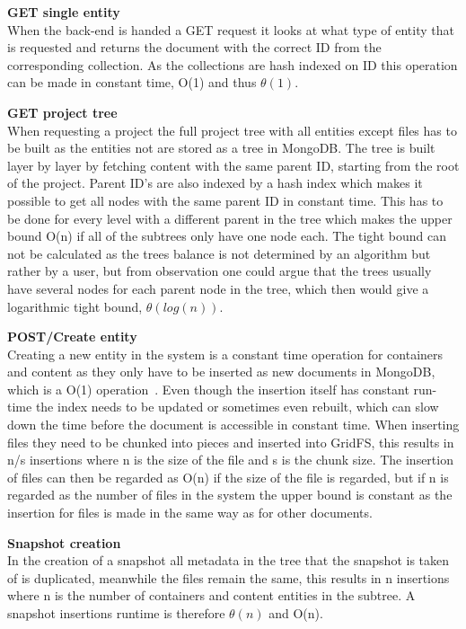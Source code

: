 \documentclass[a4paper,12pt]{article}
\begin{document}
\par \textbf{GET single entity} \\
When the back-end is handed a GET request it looks at what type of entity that is requested and
returns the document with the correct ID from the corresponding collection. As the collections are
hash indexed on ID this operation can be made in constant time, O(1) and thus $\theta(1)$. \\

\par \textbf{GET project tree} \\
When requesting a project the full project tree with all entities except files has to be built as
the entities not are stored as a tree in MongoDB. The tree is built layer by layer by fetching
content with the same parent ID, starting from the root of the project. Parent ID's are also indexed
by a hash index which makes it possible to get all nodes with the same parent ID in constant time.
This has to be done for every level with a different parent in the tree which makes the upper bound
O(n) if all of the subtrees only have one node each. The tight bound can not be calculated as the
trees balance is not determined by an algorithm but rather by a user, but from observation one could
argue that the trees usually have several nodes for each parent node in the tree, which then would
give a logarithmic tight bound, $\theta(log(n))$.\\

\par \textbf{POST/Create entity} \\
Creating a new entity in the system is a constant time operation for containers and content as they
only have to be inserted as new documents in MongoDB, which is a O(1)
operation~\cite{MONGOPERFORMANCE}. Even though the insertion itself has constant run-time the index
needs to be updated or sometimes even rebuilt, which can slow down the time before the document is
accessible in constant time. When inserting files they need to be chunked into pieces and inserted
into GridFS, this results in n/s insertions where n is the size of the file and s is the chunk size.
The insertion of files can then be regarded as O(n) if the size of the file is regarded, but if n is
regarded as the number of files in the system the upper bound is constant as the insertion for files
is made in the same way as for other documents.\\

\par \textbf{Snapshot creation} \\
In the creation of a snapshot all metadata in the tree that the snapshot is taken of is duplicated,
meanwhile the files remain the same, this results in n insertions where n is the number of
containers and content entities in the subtree. A snapshot insertions runtime is therefore
$\theta(n)$ and O(n). \\
\end{document}
